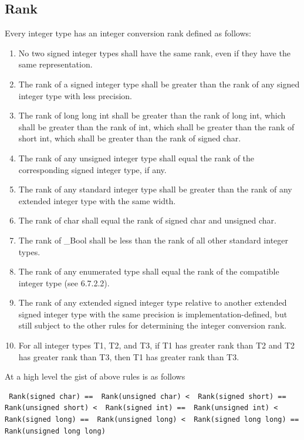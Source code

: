 \documentclass{article}
\begin{document}
\subsection{Rank}
Every integer type has an integer conversion rank defined as follows:
\begin{enumerate}[noitemsep]
    \item No two signed integer types shall have the same rank, even if they
    have the same representation.
    \item The rank of a signed integer type shall be greater than the rank of any signed integer
    type with less precision.
    \item The rank of long long int shall be greater than the rank of long int, which
    shall be greater than the rank of int, which shall be greater than the rank of short
    int, which shall be greater than the rank of signed char.
    \item The rank of any unsigned integer type shall equal the rank of the corresponding
    signed integer type, if any.
    \item The rank of any standard integer type shall be greater than the rank of any extended
    integer type with the same width.
    \item The rank of char shall equal the rank of signed char and unsigned char.
    \item The rank of \_Bool shall be less than the rank of all other standard integer types.
    \item The rank of any enumerated type shall equal the rank of the compatible integer type
    (see 6.7.2.2).
    \item The rank of any extended signed integer type relative to another extended signed
    integer type with the same precision is implementation-defined, but still subject to the
    other rules for determining the integer conversion rank.
    \item For all integer types T1, T2, and T3, if T1 has greater rank than T2 and T2 has
    greater rank than T3, then T1 has greater rank than T3.
\end{enumerate}
At a high level the gist of above rules is as follows
\begin{verbatim}
 Rank(signed char) ==  Rank(unsigned char) <  Rank(signed short) ==  Rank(unsigned short) <  Rank(signed int) ==  Rank(unsigned int) <  Rank(signed long) ==  Rank(unsigned long) <  Rank(signed long long) ==  Rank(unsigned long long)
\end{verbatim}
\end{document}
